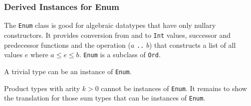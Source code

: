 \subsubsection{Derived Instances for Enum}

The \texttt{Enum} class is good for algebraic datatypes that have only nullary constructors.
It provides conversion from and to \texttt{Int} values, successor and predecessor functions and the operation ($a$ \texttt{..} $b$) that constructs a list of all values $e$ where $a \le e \le b$. \texttt{Enum} is a subclass of \texttt{Ord}.

A trivial type can be an instance of \texttt{Enum}.

Product types with arity $k>0$ cannot be instances of \texttt{Enum}. It remains to show the translation for those sum types that can be instances of \texttt{Enum}.

